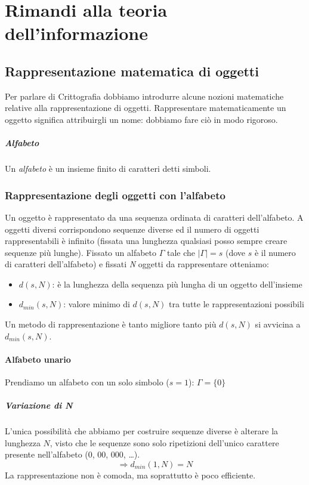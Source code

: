 \chapter{Rimandi alla teoria dell'informazione}
\section{Rappresentazione matematica di oggetti}
Per parlare di Crittografia dobbiamo introdurre alcune nozioni matematiche relative alla rappresentazione di oggetti. Rappresentare matematicamente un oggetto significa attribuirgli un nome: dobbiamo fare ciò in modo rigoroso.
\paragraph{Alfabeto} Un \emph{alfabeto} è un insieme finito di caratteri detti simboli. 
\subsection{Rappresentazione degli oggetti con l'alfabeto} Un oggetto è rappresentato da una sequenza ordinata di caratteri dell'alfabeto. A oggetti diversi corrispondono sequenze diverse ed il numero di oggetti rappresentabili è infinito (fissata una lunghezza qualsiasi posso sempre creare sequenze più lunghe). 
Fissato un alfabeto $\Gamma$ tale che $|\Gamma| = s$ (dove $s$ è il numero di caratteri dell'alfabeto) e fissati \emph{N} oggetti da rappresentare otteniamo:
\begin{itemize}
	\item $d(s, N)$: è la lunghezza della sequenza più lungha di un oggetto dell'insieme
	\item $d_{min}(s, N)$: valore minimo di $d(s, N)$ tra tutte le rappresentazioni possibili
\end{itemize}
Un metodo di rappresentazione è tanto migliore tanto più $d(s, N)$ si avvicina a $d_{min}(s, N)$.

\subsubsection{Alfabeto unario}
Prendiamo un alfabeto con un solo simbolo ($s=1$): $\Gamma = \{0\}$
\paragraph{Variazione di N} L’unica possibilità che abbiamo per costruire sequenze diverse è alterare la lunghezza $N$, visto che le sequenze sono solo ripetizioni dell’unico carattere presente nell’alfabeto (0, 00, 000, …). 
\[\Longrightarrow d_{min}\left(1,N\right)=N\]
La rappresentazione non è comoda, ma soprattutto è poco efficiente.


